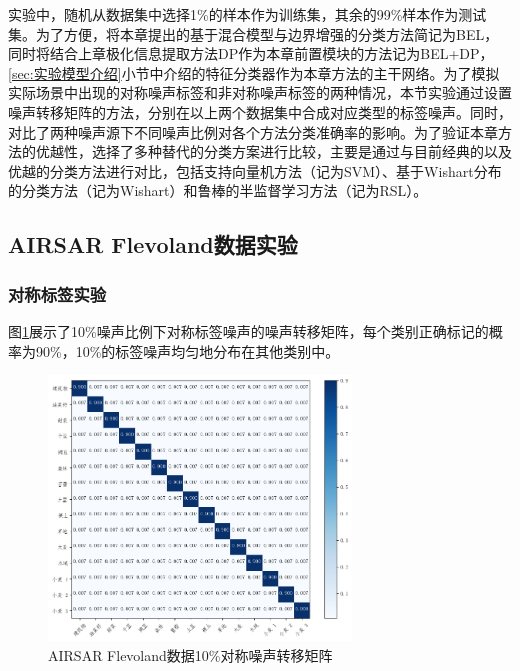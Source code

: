 实验中，随机从数据集中选择1\%的样本作为训练集，其余的99\%样本作为测试集。为了方便，将本章提出的基于混合模型与边界增强的分类方法简记为BEL，同时将结合上章极化信息提取方法DP作为本章前置模块的方法记为BEL+DP，\ref{sec:实验模型介绍}小节中介绍的特征分类器作为本章方法的主干网络。为了模拟实际场景中出现的对称噪声标签和非对称噪声标签的两种情况，本节实验通过设置噪声转移矩阵的方法，分别在以上两个数据集中合成对应类型的标签噪声。同时，对比了两种噪声源下不同噪声比例对各个方法分类准确率的影响。为了验证本章方法的优越性，选择了多种替代的分类方案进行比较，主要是通过与目前经典的以及优越的分类方法进行对比，包括支持向量机方法（记为SVM）、基于Wishart分布的分类方法（记为Wishart）和鲁棒的半监督学习方法（记为RSL）。

\subsection{AIRSAR Flevoland数据实验}
\subsubsection{对称标签实验}
图\ref{fig:fle_noise_uniform}展示了10\%噪声比例下对称标签噪声的噪声转移矩阵，每个类别正确标记的概率为90\%，10\%的标签噪声均匀地分布在其他类别中。
\begin{figure}[h]
    \centering
    \includegraphics[width=8.04cm]{pic/chapter4/fle/noise_uniform.png}
    \caption{AIRSAR Flevoland数据10\%对称噪声转移矩阵}
    \label{fig:fle_noise_uniform}
\end{figure}

